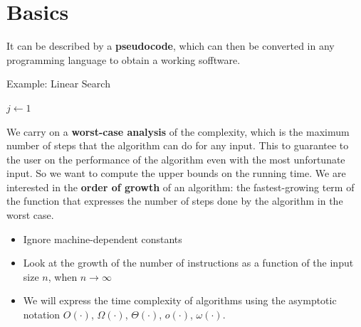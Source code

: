 
\chapter{Basics}


It can be described by a \textbf{pseudocode}, which can then be converted in any programming language to obtain a working sofftware.

\begin{algorithm}[H]
    \caption{Example: Linear Search}
    $j \gets 1$ 
\end{algorithm}


We carry on a \textbf{worst-case analysis} of the complexity, which is the maximum number of steps that the algorithm can do for any input. This to guarantee to the user on the performance of the algorithm even with the most unfortunate input. So we want to compute the upper bounds on the running time.
\newpage
We are interested in the \textbf{order of growth} of an algorithm: the fastest-growing term of the function that expresses the number of steps done by the algorithm in the worst case.

\begin{itemize}
    \item Ignore machine-dependent constants 
    \item Look at the growth of the number of instructions as a function of the input size $n$, when $n \to \infty$
    \item We will express the time complexity of algorithms using the asymptotic notation $O(\cdot)$, $\Omega(\cdot)$, $\Theta(\cdot)$, $o(\cdot)$, $\omega(\cdot)$.
\end{itemize}

